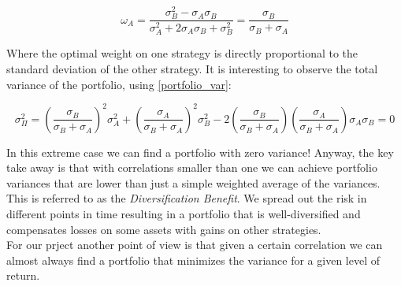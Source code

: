 \begin{equation}
\omega_A = \frac{\sigma_B^2-\sigma_A \sigma_B}{\sigma_A^2 + 2\sigma_A \sigma_B + \sigma_B^2} = \frac{\sigma_B}{\sigma_B + \sigma_A}
\end{equation}

Where the optimal weight on one strategy is directly proportional to the standard deviation of the other strategy. It is interesting to observe the total variance of the portfolio, using \eqref{portfolio_var}:

\begin{equation} 
\sigma^2_\Pi = \left(\frac{\sigma_B}{\sigma_B + \sigma_A}\right)^2 \sigma_A^2 +  \left(\frac{\sigma_A}{\sigma_B + \sigma_A}\right)^2        \sigma_B^2 - 2 \left(\frac{\sigma_B}{\sigma_B + \sigma_A}\right)  \left(\frac{\sigma_A}{\sigma_B + \sigma_A}\right)\sigma_A \sigma_B = 0
\end{equation}

In this extreme case we can find a portfolio with zero variance!
Anyway, the key take away is that with correlations smaller than one we can achieve portfolio variances that are lower than just a simple weighted average of the variances. This is referred to as the \textit{Diversification Benefit}. We spread out the risk in different points in time resulting in a portfolio that is well-diversified and compensates losses on some assets with gains on other strategies.\\
For our prject another point of view is that given a certain correlation we can almost always find a portfolio that minimizes the variance for a given level of return.\\